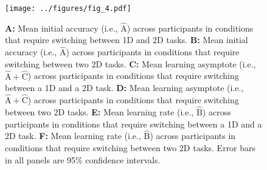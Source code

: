 \documentclass[doc, floatsintext]{apa7}
\begin{document}
\begin{figure}
    \centering
    \texttt{[image: ../figures/fig\_4.pdf]}
    \caption{
        \textbf{A:} Mean initial accuracy (i.e.,
        $\hat{\text{A}}$) across participants in conditions that
        require switching between 1D and 2D tasks.
        \textbf{B:} Mean initial accuracy (i.e.,
        $\hat{\text{A}}$) across participants in conditions that
        require switching between two 2D tasks.
        \textbf{C:} Mean learning asymptote (i.e.,
        $\hat{\text{A}}+\hat{\text{C}}$) across participants in
        conditions that require switching between a 1D and a 2D
        task.
        \textbf{D:} Mean learning asymptote (i.e.,
        $\hat{\text{A}}+\hat{\text{C}}$) across participants in
        conditions that require switching between two 2D tasks.
        \textbf{E:} Mean learning rate (i.e., $\hat{\text{B}}$)
        across participants in conditions that require switching
        between a 1D and a 2D task.
        \textbf{F:} Mean learning rate (i.e., $\hat{\text{B}}$)
        across participants in conditions that require switching
        between two 2D tasks.  Error bars in all panels are 95\%
        confidence intervals.
    }
    \label{fig_4}
\end{figure}

\end{document}
